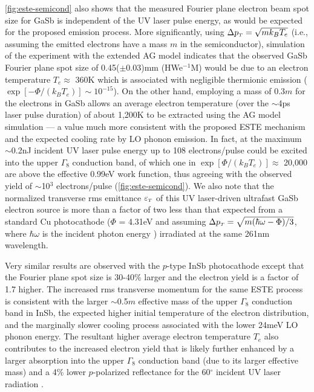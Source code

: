 \ref{fig:este-semicond} also shows that the measured Fourier plane electron beam spot size for GaSb is independent of the UV laser pulse energy, as would be expected for the proposed emission process.
More significantly, using $\Delta p_{{\scriptscriptstyle T}} = \sqrt{m k_B T_e}$ (i.e., assuming the emitted electrons have a mass $m$ in the semiconductor), simulation of the experiment with the extended AG model \cite{berger_semi-analytic_2010} indicates that the observed GaSb Fourier plane spot size of 0.45($\pm$0.03)mm (HWe$^{-1}$M) would be due to an electron temperature $T_e \approx$ 360K which is associated with negligible thermionic emission ($\exp[-\Phi/(k_B T_e)] \sim 10^{-15}$).
On the other hand, employing a mass of 0.3$m$ for the electrons in GaSb allows an average electron temperature (over the $\sim$4ps laser pulse duration) of about 1,200K to be extracted using the AG model simulation --- a value much more consistent with the proposed ESTE mechanism and the expected cooling rate by LO phonon emission.
In fact, at the maximum $\sim$0.2nJ incident UV laser pulse energy up to 108 electrons/pulse could be excited into the upper $\Gamma_8$ conduction band, of which one in $\exp[\Phi/(k_B T_e)] \approx$ 20,000 are above the effective 0.99eV work function, thus agreeing with the observed yield of $\sim$10$^3$ electrons/pulse (\ref{fig:este-semicond}).
We also note that the normalized transverse rms emittance $\varepsilon_{{\scriptscriptstyle T}}$ of this UV laser-driven ultrafast GaSb electron source is more than a factor of two less than that expected from a standard Cu photocathode ($\Phi$ = 4.31eV and assuming $\Delta p_{{\scriptscriptstyle T}} = \sqrt{m ( \hbar \omega - \Phi ) / 3 }$, where $\hbar \omega$ is the incident photon energy \cite{dowell_quantum_2009,jensen_emittance_2010}) irradiated at the same 261nm wavelength.

Very similar results are observed with the $p$-type InSb photocathode except that the Fourier plane spot size is 30-40\%  larger and the electron yield is a factor of 1.7 higher.
The increased rms transverse momentum for the same ESTE process is consistent with the larger $\sim$0.5$m$ effective mass of the upper $\Gamma_8$ conduction band in InSb, the expected higher initial temperature of the electron distribution, and the marginally slower cooling process associated with the lower 24meV LO phonon energy.
The resultant higher average electron temperature $T_e$ also contributes to the increased electron yield that is likely further enhanced by a larger absorption into the upper $\Gamma_8$ conduction band (due to its larger effective mass) and a 4\% lower $p$-polarized reflectance for the 60$^{\circ}$ incident UV laser radiation \cite{aspnes_dielectric_1983}. 


